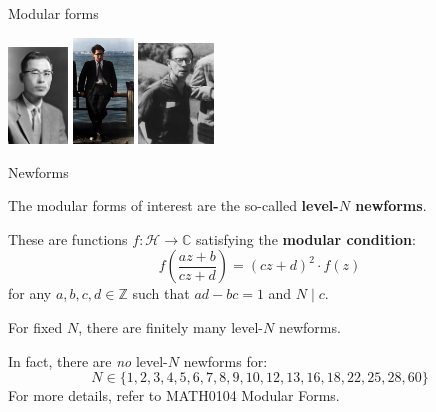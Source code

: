\documentclass[10pt]{beamer}
\theoremstyle{definition}
\begin{document}
\begin{frame}[t]{Modular forms}
\begin{center}
\includegraphics[width=0.12\textwidth]{shimura.jpg}
\hspace{0.5cm}
\includegraphics[width=0.12\textwidth]{taniyama.jpg}
\hspace{0.5cm}
\includegraphics[width=0.15\textwidth]{weil.jpg}
\end{center}

\end{frame}

\begin{frame}[t]{Newforms}

The modular forms of interest are the so-called \textbf{level-$ N $ newforms}.

\vspace{0.5cm} These are functions $ f : \mathcal{H} \to \mathbb{C} $ satisfying the \textbf{modular condition}:
$$ f\left(\dfrac{az + b}{cz + d}\right) = (cz + d)^2 \cdot f(z) $$
for any $ a, b, c, d \in \mathbb{Z} $ such that $ ad - bc = 1 $ and $ N \mid c $.

\vspace{0.5cm}

\begin{theorem}
For fixed $ N $, there are finitely many level-$ N $ newforms.
\end{theorem}

\vspace{0.5cm} In fact, there are \emph{no} level-$ N $ newforms for:
$$ N \in \{1, 2, 3, 4, 5, 6, 7, 8, 9, 10, 12, 13, 16, 18, 22, 25, 28, 60\} $$
For more details, refer to MATH0104 Modular Forms.

\end{frame}
\end{document}
